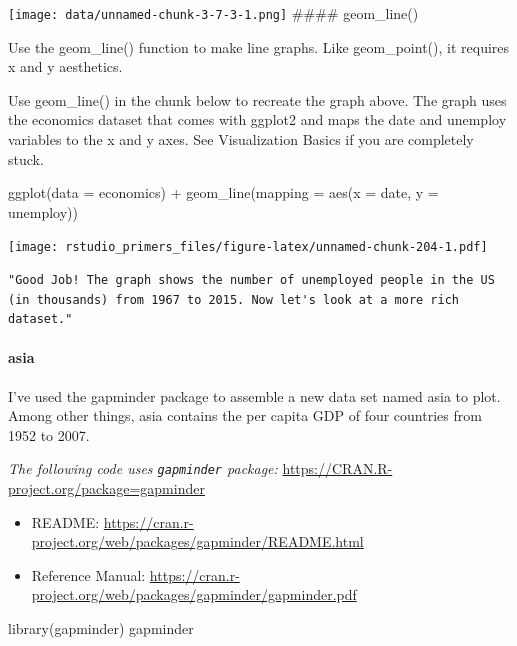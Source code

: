 \documentclass[
]{article}
\newenvironment{Shaded}{\begin{snugshade}}{\end{snugshade}}
\newcommand{\AttributeTok}[1]{\textcolor[rgb]{0.77,0.63,0.00}{#1}}
\newcommand{\FunctionTok}[1]{\textcolor[rgb]{0.00,0.00,0.00}{#1}}
\newcommand{\NormalTok}[1]{#1}
\newcommand{\SpecialCharTok}[1]{\textcolor[rgb]{0.00,0.00,0.00}{#1}}
\providecommand{\tightlist}{%
  \setlength{\itemsep}{0pt}\setlength{\parskip}{0pt}}
\begin{document}
\texttt{[image: data/unnamed-chunk-3-7-3-1.png]} \#\#\#\# geom\_line()

Use the geom\_line() function to make line graphs. Like geom\_point(),
it requires x and y aesthetics.

Use geom\_line() in the chunk below to recreate the graph above. The
graph uses the economics dataset that comes with ggplot2 and maps the
date and unemploy variables to the x and y axes. See Visualization
Basics if you are completely stuck.

\begin{Shaded}
\begin{Highlighting}[]
\FunctionTok{ggplot}\NormalTok{(}\AttributeTok{data =}\NormalTok{ economics) }\SpecialCharTok{+} 
  \FunctionTok{geom\_line}\NormalTok{(}\AttributeTok{mapping =} \FunctionTok{aes}\NormalTok{(}\AttributeTok{x =}\NormalTok{ date, }\AttributeTok{y =}\NormalTok{ unemploy))}
\end{Highlighting}
\end{Shaded}

\texttt{[image: rstudio\_primers\_files/figure-latex/unnamed-chunk-204-1.pdf]}

\begin{verbatim}
"Good Job! The graph shows the number of unemployed people in the US (in thousands) from 1967 to 2015. Now let's look at a more rich dataset."
\end{verbatim}

\hypertarget{asia}{%
\paragraph{asia}\label{asia}}

I've used the gapminder package to assemble a new data set named asia to
plot. Among other things, asia contains the per capita GDP of four
countries from 1952 to 2007.

\emph{The following code uses \texttt{gapminder} package:}
\url{https://CRAN.R-project.org/package=gapminder}

\begin{itemize}
\tightlist
\item
  README:
  \url{https://cran.r-project.org/web/packages/gapminder/README.html}
\item
  Reference Manual:
  \url{https://cran.r-project.org/web/packages/gapminder/gapminder.pdf}
\end{itemize}

\begin{Shaded}
\begin{Highlighting}[]
\FunctionTok{library}\NormalTok{(gapminder)}
\NormalTok{gapminder}
\end{Highlighting}
\end{Shaded}
\end{document}
